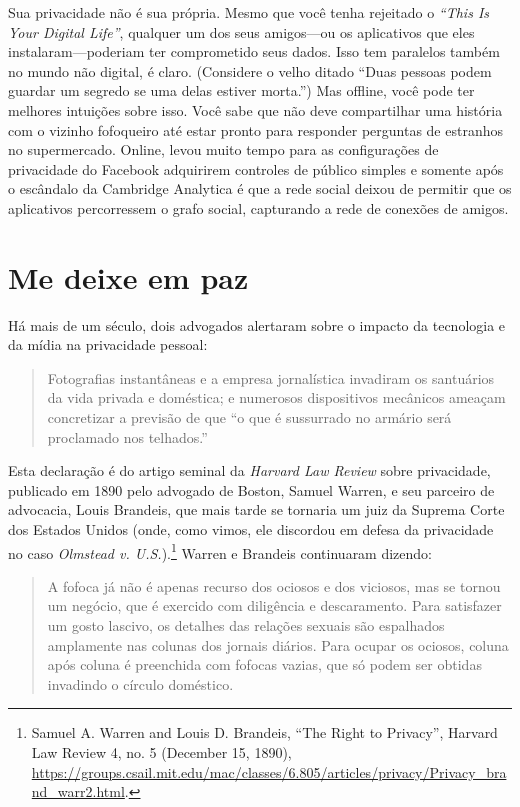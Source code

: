 \documentclass{book}
\newcommand{\ingles}[1]{\textit{#1}}
\begin{document}
Sua privacidade não é sua própria. Mesmo que você tenha rejeitado o \ingles{``This
Is Your Digital Life''}, qualquer um dos seus amigos---ou os aplicativos que eles
instalaram---poderiam ter comprometido seus dados. Isso tem paralelos também no
mundo não digital, é claro. (Considere o velho ditado ``Duas pessoas podem guardar
um segredo se uma delas estiver morta.'') Mas offline, você pode ter melhores
intuições sobre isso. Você sabe que não deve compartilhar uma história com o
vizinho fofoqueiro até estar pronto para responder perguntas de estranhos no
supermercado. Online, levou muito tempo para as configurações de privacidade do
Facebook adquirirem controles de público simples e somente após o escândalo da
Cambridge Analytica é que a rede social deixou de permitir que os aplicativos
percorressem o grafo social, capturando a rede de conexões de amigos.

\section{Me deixe em paz}
\label{quem:paz}
Há mais de um século, dois advogados alertaram sobre o impacto da tecnologia
e da mídia na privacidade pessoal: 

\begin{quote}
Fotografias instantâneas e a empresa jornalística invadiram os santuários da
vida privada e doméstica; e numerosos dispositivos mecânicos ameaçam concretizar
a previsão de que ``o que é sussurrado no armário será proclamado nos telhados.'' 
\end{quote}

Esta declaração é do artigo seminal da \ingles{Harvard Law Review} sobre privacidade,
publicado em 1890 pelo advogado de Boston, Samuel Warren, e seu parceiro de
advocacia, Louis Brandeis, que mais tarde se tornaria um juiz da Suprema Corte
dos Estados Unidos (onde, como vimos, ele discordou em defesa da privacidade
no caso \ingles{Olmstead v. U.S.}).\footnote{Samuel A. Warren and Louis D.
Brandeis, ``The Right to Privacy'', Harvard Law Review 4, no. 5 (December 15, 1890),
\url{https://groups.csail.mit.edu/mac/classes/6.805/articles/privacy/Privacy_brand_warr2.html}.}
Warren e Brandeis continuaram dizendo: 

\begin{quote}
A fofoca já não é apenas recurso dos ociosos e dos viciosos, mas se tornou
um negócio, que é exercido com diligência e descaramento. Para satisfazer um gosto
lascivo, os detalhes das relações sexuais são espalhados amplamente nas colunas
dos jornais diários. Para ocupar os ociosos, coluna após coluna é preenchida com
fofocas vazias, que só podem ser obtidas invadindo o círculo doméstico.
\end{quote}
\end{document}
